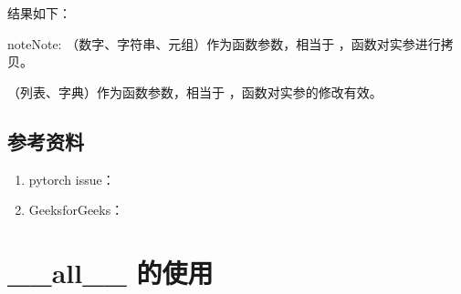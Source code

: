 \documentclass[letterpaper,10pt,english]{sphinxmanual}
\begin{document}
结果如下：

%
\begin{sphinxVerbatim}[commandchars=\\\{\}]
 
 
 
 
\end{sphinxVerbatim}

\begin{sphinxadmonition}{note}{Note:}
 （数字、字符串、元组）作为函数参数，相当于  ，函数对实参进行拷贝。

 （列表、字典）作为函数参数，相当于  ，函数对实参的修改有效。
\end{sphinxadmonition}


\subsection{参考资料}
\label{\detokenize{python/01_inplace:id2}}\begin{enumerate}
\item {} 
pytorch issue：

\end{enumerate}
\begin{quote}

\end{quote}
\begin{enumerate}
\setcounter{enumi}{1}
\item {} 
GeeksforGeeks：

\end{enumerate}
\begin{quote}

\end{quote}


\section{\_\_all\_\_ 的使用}
\label{\detokenize{python/02_all:all}}\label{\detokenize{python/02_all::doc}}
\end{document}
